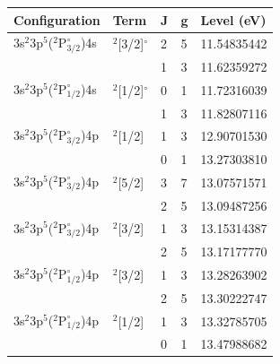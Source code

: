 \begin{table}[]
\footnotesize
\centering
\begin{tabular}{lllll}
\hline \hline
Configuration    & Term        & J & g & Level (eV) \\ \hline \hline
3s$^\text{2}$3p$^\text{5}$($^\text{2}\text{P}^{\circ}_\text{3/2}$)4s & $^\text{2}${[}3/2{]}$^{\circ}$ & 2 & 5 & 11.54835442                                            \\
                 &             & 1 & 3 & 11.62359272                                            \\
3s$^\text{2}$3p$^\text{5}$($^\text{2}\text{P}^{\circ}_\text{1/2}$)4s & $^\text{2}${[}1/2{]}$^{\circ}$ & 0 & 1 & 11.72316039                                            \\
                 &             & 1 & 3 & 11.82807116                                            \\ \hline
3s$^\text{2}$3p$^\text{5}$($^\text{2}\text{P}^{\circ}_\text{3/2}$)4p & $^\text{2}${[}1/2{]}  & 1 & 3 & 12.90701530                                            \\
                 &             & 0 & 1 & 13.27303810                                            \\
3s$^\text{2}$3p$^\text{5}$($^\text{2}\text{P}^{\circ}_\text{3/2}$)4p & $^\text{2}${[}5/2{]}  & 3 & 7 & 13.07571571                                            \\
                 &             & 2 & 5 & 13.09487256                                            \\
3s$^\text{2}$3p$^\text{5}$($^\text{2}\text{P}^{\circ}_\text{3/2}$)4p & $^\text{2}${[}3/2{]}  & 1 & 3 & 13.15314387                                            \\
                 &             & 2 & 5 & 13.17177770                                            \\
3s$^\text{2}$3p$^\text{5}$($^\text{2}\text{P}^{\circ}_\text{1/2}$)4p & $^\text{2}${[}3/2{]}  & 1 & 3 & 13.28263902                                            \\
                 &             & 2 & 5 & 13.30222747                                            \\
3s$^\text{2}$3p$^\text{5}$($^\text{2}\text{P}^{\circ}_\text{1/2}$)4p & $^\text{2}${[}1/2{]}  & 1 & 3 & 13.32785705                                            \\
                 &             & 0 & 1 & 13.47988682                                            \\ \hline

\end{tabular}
\end{table}
